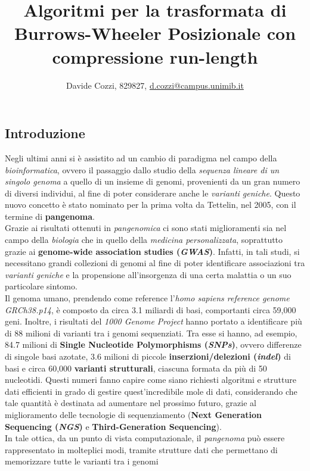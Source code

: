 \documentclass[a4paper,11pt, oneside]{article}
\title{\vspace{-1.75cm}Algoritmi per la trasformata di Burrows-Wheeler
  Posizionale con compressione run-length}
\author{Davide Cozzi, 829827, 
  \href{mailto:d.cozzi@campus.unimib.it}{d.cozzi@campus.unimib.it}}
\date{}
\begin{document}
\maketitle
{}
\noindent
\subsection*{Introduzione}
Negli ultimi anni si è assistito ad un cambio di paradigma nel campo della
\textit{bioinformatica}, ovvero il passaggio dallo studio della \textit{sequenza
  lineare di un singolo genoma} a quello di un insieme di
genomi, provenienti da un gran numero di diversi individui, al fine di poter
considerare anche le \textit{varianti geniche}. Questo
nuovo concetto è stato 
nominato per la prima 
volta da Tettelin, nel 2005, con il termine di \textbf{pangenoma}.\\
Grazie ai risultati ottenuti in \textit{pangenomica} ci sono stati
miglioramenti sia nel campo della \textit{biologia} che in quello
della \textit{medicina personalizzata}, soprattutto grazie ai
\textbf{genome-wide association studies (\textit{GWAS})}. Infatti, in tali
studi, si necessitano grandi collezioni di genomi al fine di poter
identificare associazioni tra \textit{varianti geniche} e la propensione
all'insorgenza di una
certa malattia o un suo particolare sintomo.\\
Il genoma umano,
prendendo come reference l'\textit{homo sapiens reference
genome GRCh38.p14}, è composto da circa
3.1 miliardi di basi, comportanti circa 59,000 geni. Inoltre, i risultati del
\textit{1000 Genome Project} hanno portato a identificare più di 88 milioni di
varianti tra i genomi sequenziati. Tra esse si hanno, ad esempio, 84.7 milioni
di \textbf{Single Nucleotide Polymorphisms (\textit{SNPs})}, ovvero differenze
di singole basi azotate, 3.6 milioni di piccole \textbf{inserzioni/delezioni
  (\textit{indel})} di basi e circa 60,000 \textbf{varianti strutturali},
ciascuna formata da più di 50 nucleotidi. Questi numeri fanno capire come siano
richiesti algoritmi e strutture 
dati efficienti in grado di gestire quest'incredibile mole di dati, considerando
che tale quantità è destinata ad aumentare nel prossimo futuro, grazie al
miglioramento delle tecnologie di sequenziamento (\textbf{Next Generation
  Sequencing (\textit{NGS})} e \textbf{Third-Generation Sequencing}).\\ 
In tale ottica, da un punto di vista computazionale, il
\textit{pangenoma} può essere rappresentato in molteplici modi, tramite
strutture dati che permettano di memorizzare tutte le varianti tra i genomi
\end{document}
